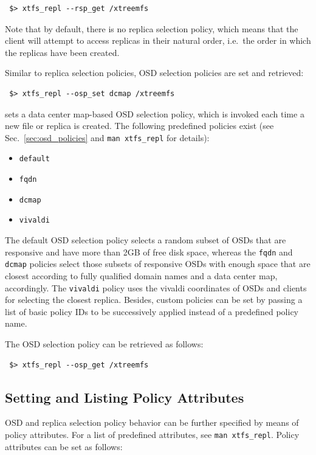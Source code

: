 \documentclass[a4paper,10pt]{book}
\begin{document}
\begin{verbatim}
 $> xtfs_repl --rsp_get /xtreemfs
\end{verbatim}

Note that by default, there is no replica selection policy, which means that the client will attempt to access replicas in their natural order, i.e.\ the order in which the replicas have been created.

Similar to replica selection policies, OSD selection policies are set and retrieved:

\begin{verbatim}
 $> xtfs_repl --osp_set dcmap /xtreemfs
\end{verbatim}

sets a data center map-based OSD selection policy, which is invoked each time a new file or replica is created. The following predefined policies exist (see Sec.\ \ref{sec:osd_policies} and \texttt{man xtfs\_repl} for details):

\begin{itemize}
 \item \texttt{default}
 \item \texttt{fqdn}
 \item \texttt{dcmap}
 \item \texttt{vivaldi}
\end{itemize}

The default OSD selection policy selects a random subset of OSDs that are responsive and have more than 2GB of free disk space, whereas the \texttt{fqdn} and \texttt{dcmap} policies select those subsets of responsive OSDs with enough space that are closest according to fully qualified domain names and a data center map, accordingly. The \texttt{vivaldi} policy uses the vivaldi coordinates of OSDs and clients for selecting the closest replica. Besides, custom policies can be set by passing a list of basic policy IDs to be successively applied instead of a predefined policy name.

The OSD selection policy can be retrieved as follows:

\begin{verbatim}
 $> xtfs_repl --osp_get /xtreemfs
\end{verbatim}

\subsection{Setting and Listing Policy Attributes}

OSD and replica selection policy behavior can be further specified by means of policy attributes. For a list of predefined attributes, see \texttt{man xtfs\_repl}. Policy attributes can be set as follows:
\end{document}
